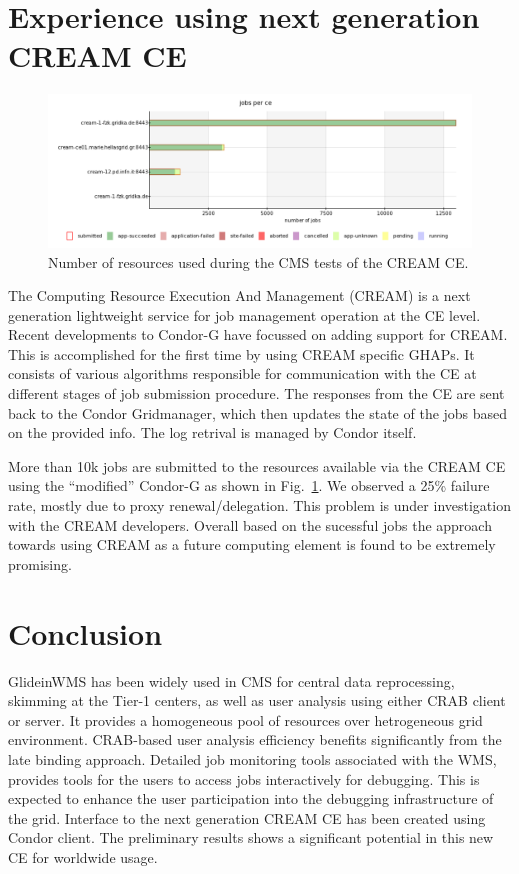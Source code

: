 \documentclass[a4paper]{jpconf}
\begin{document}
\section{Experience using next generation CREAM CE}
\begin{figure}
\begin{center}
\includegraphics[scale=0.45]{cms_cream}
\end{center}
\caption{Number of resources used during the CMS tests of the CREAM CE.}
\label{fig:cms_cream}
\end{figure}
The Computing Resource Execution And Management (CREAM) is a next generation lightweight service 
for job management operation at the CE level. Recent developments to Condor-G have focussed on adding 
support for CREAM. This is accomplished for the first time by using CREAM specific GHAPs. It consists 
of various algorithms responsible for communication with the CE at different stages of job submission
procedure. The responses from the CE are sent back to the Condor Gridmanager, which then updates 
the state of the jobs based on the provided info. The log retrival is managed by Condor itself.

More than 10k jobs are submitted to the resources available via the CREAM CE using the ``modified'' Condor-G as 
shown in Fig.~\ref{fig:cms_cream}. We observed a 25\% failure rate, mostly due to proxy renewal/delegation. 
This problem is under investigation with the CREAM developers. Overall based on the sucessful jobs
the approach towards using CREAM as a future computing element is found to be extremely promising.
\section{Conclusion}
GlideinWMS has been widely used in CMS for central data reprocessing, skimming at the Tier-1 centers, as well
as user analysis using either CRAB client or server. It provides a homogeneous pool of resources over
hetrogeneous grid environment. CRAB-based user analysis efficiency benefits significantly from the late
binding approach. Detailed job monitoring tools associated with the WMS, provides tools for the users to access 
jobs interactively for debugging. This is expected to enhance the user participation into the debugging 
infrastructure of the grid. Interface to the next generation CREAM CE has been created using Condor client. 
The preliminary results shows a significant potential in this new CE for worldwide usage. 
\end{document}

